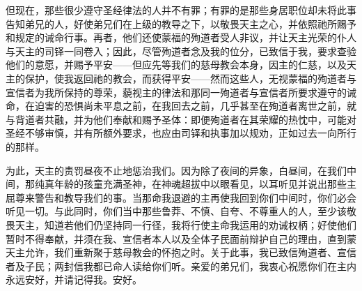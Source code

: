 但现在，那些很少遵守圣经律法的人并不有罪；有罪的是那些身居职位却未将此事告知弟兄的人，好使弟兄们在上级的教导之下，以敬畏天主之心，并依照祂所赐予和规定的诫命行事。再者，他们还使蒙福的殉道者受人非议，并让天主光荣的仆人与天主的司铎一同卷入；因此，尽管殉道者念及我的位分，已致信于我，要求查验他们的意愿，并赐予平安——但应先等我们的慈母教会本身，因主的仁慈，以及天主的保护，使我返回祂的教会，而获得平安——然而这些人，无视蒙福的殉道者与宣信者为我所保持的尊荣，藐视主的律法和那同一殉道者与宣信者所要求遵守的诫命，在迫害的恐惧尚未平息之前，在我回去之前，几乎甚至在殉道者离世之前，就与背道者共融，并为他们奉献和赐予圣体：即便殉道者在其荣耀的热忱中，可能对圣经不够审慎，并有所额外要求，也应由司铎和执事加以规劝，正如过去一向所行的那样。\par

为此，天主的责罚昼夜不止地惩治我们。因为除了夜间的异象，白昼间，在我们中间，那纯真年龄的孩童充满圣神，在神魂超拔中以眼看见，以耳听见并说出那些主屈尊来警告和教导我们的事。当那命我退避的主再使我回到你们中间时，你们必会听见一切。与此同时，你们当中那些鲁莽、不慎、自夸、不尊重人的人，至少该敬畏天主，知道若他们仍坚持同一行径，我将行使主命我运用的劝诫权柄；好使他们暂时不得奉献，并须在我、宣信者本人以及全体子民面前辩护自己的理由，直到蒙天主允许，我们重新聚于慈母教会的怀抱之时。关于此事，我已致信殉道者、宣信者及子民；两封信我都已命人读给你们听。亲爱的弟兄们，我衷心祝愿你们在主内永远安好，并请记得我。安好。\par



\section{}

\par

\par

